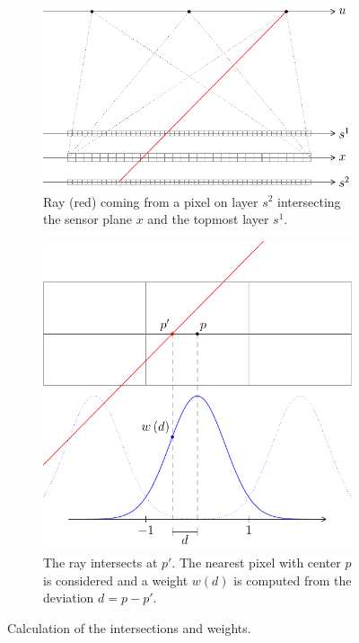 \documentclass[11pt,a4paper,titlepage]{article}
\begin{document}
\begin{figure}[h]
	\centering
	\begin{subfigure}[t]{0.4\textwidth}
 		\includegraphics[width=\textwidth]{sketches/sheared_projections_layers_overview-1.pdf} 
  		\caption{Ray (red) coming from a pixel on layer $s^2$ intersecting the sensor plane $x$ and the topmost  layer $s^1$. }
  		\label{fig:intersections_and_weights_overview}
	\end{subfigure}%
	\quad
	\begin{subfigure}[t]{0.4\textwidth}
		\includegraphics[width=\textwidth]{sketches/sheared_projections_layers_overview-2.pdf} 
  		\caption{The ray intersects at $p'$. The nearest pixel with center $p$ is considered and a weight $w\left(d\right)$ is computed from the deviation $d = p - p'$.}
	\end{subfigure}%
	\caption{Calculation of the intersections and weights.}
	\label{fig:intersections_and_weights}
\end{figure}
\end{document}
